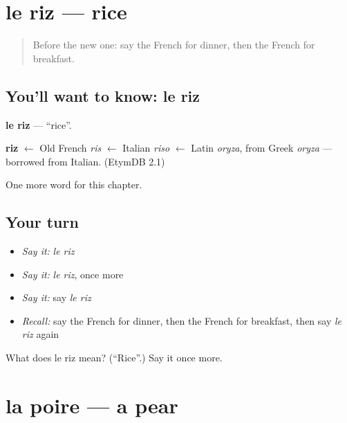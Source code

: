 \section[le riz]{le riz — rice}

\label{lesson:FR-C70-riz}



\begin{quote}
Before the new one: say the French for dinner, then the French for breakfast.
\end{quote}

\subsection*{You'll want to know: le riz}
\textbf{le riz} — \textquotedblleft{}rice\textquotedblright{}.

\begin{cousinweb}
\textbf{riz} $\leftarrow$ Old French \emph{ris} $\leftarrow$ Italian \emph{riso} $\leftarrow$ Latin \emph{oryza}, from Greek \emph{oryza} — borrowed from Italian. (EtymDB 2.1)
\end{cousinweb}

\begin{grammarlens}[title={What you've built}]
One more word for this chapter.
\end{grammarlens}

\subsection*{Your turn}
\begin{itemize}
\raggedright
  \item \emph{Say it:} \emph{le riz}
  \item \emph{Say it:} \emph{le riz}, once more
  \item \emph{Say it:} say \emph{le riz}
  \item \emph{Recall:} say the French for dinner, then the French for breakfast, then say \emph{le riz} again
\end{itemize}

\begin{tcolorbox}[breakable,colback=teal!4,colframe=teal!35!black,title={Before you move on}]
What does le riz mean? (\textquotedblleft{}Rice\textquotedblright{}.) Say it once more.
\end{tcolorbox}
\section[la poire]{la poire — a pear}

